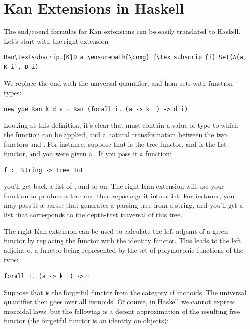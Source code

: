 \section{Kan Extensions in Haskell}\label{kan-extensions-in-haskell}

The end/coend formulas for Kan extensions can be easily translated to
Haskell. Let's start with the right extension:

\begin{Verbatim}[commandchars=\\\{\}]
Ran\textsubscript{K}D a \ensuremath{\cong} ∫\textsubscript{i} Set(A(a, K i), D i)
\end{Verbatim}
We replace the end with the universal quantifier, and hom-sets with
function types:

\begin{Verbatim}[commandchars=\\\{\}]
newtype Ran k d a = Ran (forall i. (a -> k i) -> d i)
\end{Verbatim}
Looking at this definition, it's clear that  must contain a
value of type  to which the function can be applied, and a
natural transformation between the two functors  and
. For instance, suppose that  is the tree functor,
and  is the list functor, and you were given a
. If you pass it a function:

\begin{Verbatim}[commandchars=\\\{\}]
f :: String -> Tree Int
\end{Verbatim}
you'll get back a list of , and so on. The right Kan
extension will use your function to produce a tree and then repackage it
into a list. For instance, you may pass it a parser that generates a
parsing tree from a string, and you'll get a list that corresponds to
the depth-first traversal of this tree.

The right Kan extension can be used to calculate the left adjoint of a
given functor by replacing the functor  with the identity
functor. This leads to the left adjoint of a functor  being
represented by the set of polymorphic functions of the type:

\begin{Verbatim}[commandchars=\\\{\}]
forall i. (a -> k i) -> i
\end{Verbatim}
Suppose that  is the forgetful functor from the category of
monoids. The universal quantifier then goes over all monoids. Of course,
in Haskell we cannot express monoidal laws, but the following is a
decent approximation of the resulting free functor (the forgetful
functor  is an identity on objects):

